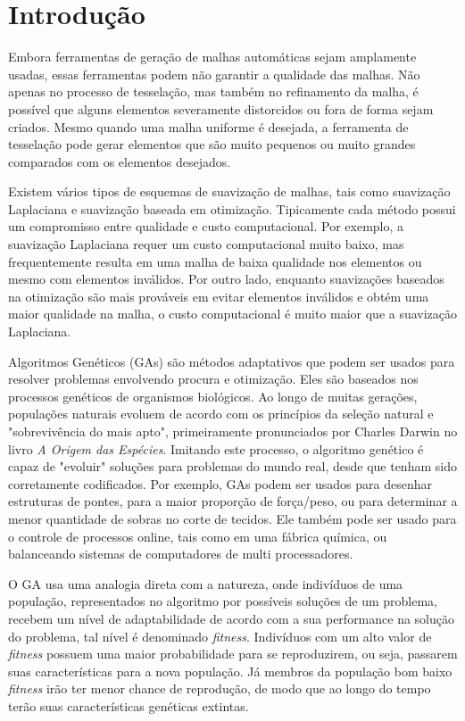 \documentclass[review]{elsarticle}
\begin{document}
\linenumbers

\section{Introdução}

Embora ferramentas de geração de malhas automáticas sejam amplamente usadas, essas ferramentas podem não garantir a qualidade das malhas. Não apenas no processo de tesselação, mas também no refinamento da malha, é possível que alguns elementos severamente distorcidos ou fora de forma sejam criados. Mesmo quando uma malha uniforme é desejada, a ferramenta de tesselação pode gerar elementos que são muito pequenos ou muito grandes comparados com os elementos desejados. \cite{Zhou}

Existem vários tipos de esquemas de suavização de malhas, tais como suavização Laplaciana e suavização baseada em otimização. Tipicamente cada método possui um compromisso entre qualidade e custo computacional. Por exemplo, a suavização Laplaciana requer um custo computacional muito baixo, mas frequentemente resulta em uma malha de baixa qualidade nos elementos ou mesmo com elementos inválidos. Por outro lado, enquanto suavizações baseados na otimização são mais prováveis em evitar elementos inválidos e obtém uma maior qualidade na malha, o custo computacional é muito maior que a suavização Laplaciana. \cite{Zhou}

Algoritmos Genéticos (GAs) são métodos adaptativos que podem ser usados para resolver problemas envolvendo procura e otimização. Eles são baseados nos processos genéticos de organismos biológicos. Ao longo de muitas gerações, populações naturais evoluem de acordo com os princípios da seleção natural e "sobrevivência do mais apto", primeiramente pronunciados por Charles Darwin no livro \textit{A Origem das Espécies}. Imitando este processo, o algoritmo genético é capaz de "evoluir" soluções para problemas do mundo real, desde que tenham sido corretamente codificados. Por exemplo, GAs podem ser usados para desenhar estruturas de pontes, para a maior proporção de força/peso, ou para determinar a menor quantidade de sobras no corte de tecidos. Ele também pode ser usado para o controle de processos online, tais como em uma fábrica química, ou balanceando sistemas de computadores de multi processadores. \cite{Beasley1993}

O GA usa uma analogia direta com a natureza, onde indivíduos de uma população, representados no algoritmo por possíveis soluções de um problema, recebem um nível de adaptabilidade de acordo com a sua performance na solução do problema, tal nível é denominado \textit{fitness}. Indivíduos com um alto valor de \textit{fitness} possuem uma maior probabilidade para se reproduzirem, ou seja, passarem suas características para a nova população. Já membros da população bom baixo \textit{fitness} irão ter menor chance de reprodução, de modo que ao longo do tempo terão suas características genéticas extintas.
\end{document}
